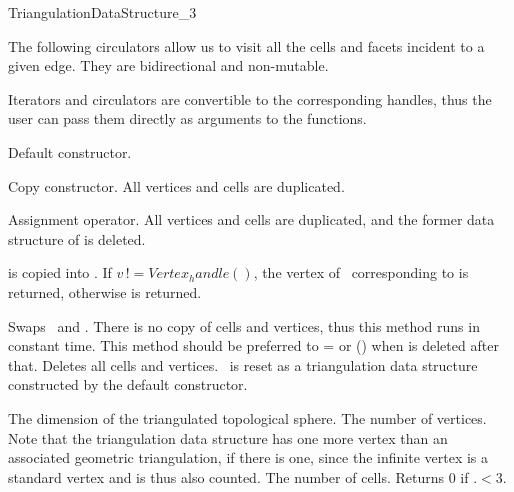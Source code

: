 \begin{ccRefConcept}{TriangulationDataStructure_3}
\ccGlue
{}
\ccGlue
{}
\ccGlue
{}

The following circulators allow us to visit all the cells and facets
incident to a given edge. They are bidirectional and non-mutable.

\ccGlue
{}

Iterators and circulators are convertible to the corresponding handles, thus
the user can pass them directly as arguments to the functions.

\ccCreation
{}  %
\ccThreeToTwo

{Default constructor.}

{Copy constructor. All vertices and cells are duplicated.}

{Assignment operator. All vertices and cells are duplicated, and the former
data structure of  is deleted.}


{ is copied into \ccVar. If $v\, !\!= Vertex_handle()$,
the vertex of \ccVar\ corresponding to  is returned,
otherwise  is returned.
}

{Swaps \ccVar\ and . There is no copy of cells and vertices,
thus this method runs in constant time. This method should be preferred to
\ccVar= or \ccVar() when  is deleted after
that.}
\ccGlue
{}
{Deletes all cells and vertices. \ccVar\ is reset as a triangulation
data structure constructed by the default constructor.}

\ccOperations

\ccAccessFunctions
{}

{The dimension of the triangulated topological sphere.}
\ccGlue
{}
{The number of vertices. Note that the triangulation data structure has one
more vertex than an associated geometric triangulation, if there is
one, since the infinite vertex is a standard vertex and is thus also
counted.} 
\ccGlue
{}
{The number of cells. Returns 0 if \ccVar.$<3$.}


\end{ccRefConcept}
